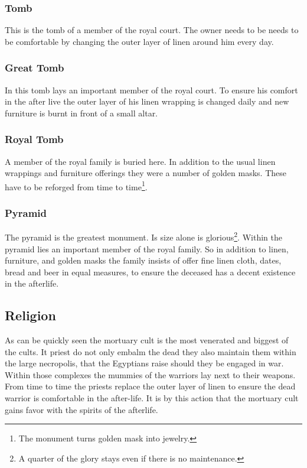 \subsubsection{Tomb}
This is the tomb of a member of the royal court. The owner needs to be needs to
be comfortable by changing the outer layer of linen around him every day.

\subsubsection{Great Tomb}
In this tomb lays an important member of the royal court. To ensure his comfort
in the after live the outer layer of his linen wrapping is changed daily and
new furniture is burnt in front of a small altar.

\subsubsection{Royal Tomb}
A member of the royal family is buried here. In addition to the usual linen
wrappings and furniture offerings they were a number of golden masks. These
have to be reforged from time to time\footnote{ The monument turns golden mask
	into jewelry. }.

\subsubsection{Pyramid}
The pyramid is the greatest monument. Is size alone is glorious\footnote{ A
	quarter of the glory stays even if there is no maintenance. }. Within the
pyramid lies an important member of the royal family. So in addition to linen,
furniture, and golden masks the family insists of offer fine linen cloth,
dates, bread and beer in equal measures, to ensure the deceased has a decent
existence in the afterlife.

\subsection{Religion}
As can be quickly seen the mortuary cult is the most venerated and biggest of
the cults. It priest do not only embalm the dead they also maintain them within
the large necropolis, that the \gls{Egyptians} raise should they be engaged in
war. Within those complexes the mummies of the warriors lay next to their
weapons. From time to time the priests replace the outer layer of linen to
ensure the dead warrior is comfortable in the after-life. It is by this action
that the mortuary cult gains favor with the spirits of the afterlife.

